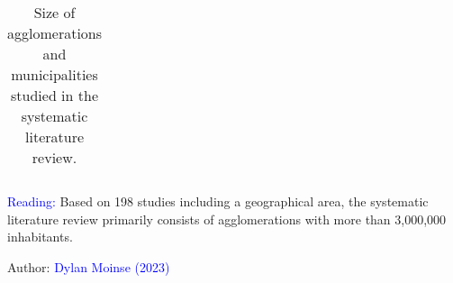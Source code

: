 \begin{table}[h!]
{\begin{tabular}{p{}}
        \hline
        \end{tabular}}
    \caption{Size of agglomerations and municipalities studied in the systematic literature review.}
    \label{table-chap2:tailles-territoires-rsl}
        \vspace{5pt}
        \begin{flushleft}\scriptsize{
        \textcolor{blue}{Reading:} Based on 198 studies including a geographical area, the systematic literature review primarily consists of agglomerations with more than 3,000,000 inhabitants.
        }\end{flushleft}
        \begin{flushright}\scriptsize
        Author: \textcolor{blue}{Dylan Moinse (2023)}
        \end{flushright}
        \end{table}